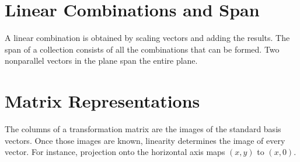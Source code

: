\documentclass[11pt,letterpaper,oneside,openany]{textbookchapter}
\begin{document}
\section{Linear Combinations and Span}
A linear combination is obtained by scaling vectors and adding the results.
The span of a collection consists of all the combinations that can be
formed. Two nonparallel vectors in the plane span the entire plane.

\section{Matrix Representations}
The columns of a transformation matrix are the images of the standard basis
vectors. Once those images are known, linearity determines the image of
every vector. For instance, projection onto the horizontal axis maps
\((x,y)\) to \((x,0)\).
\end{document}
